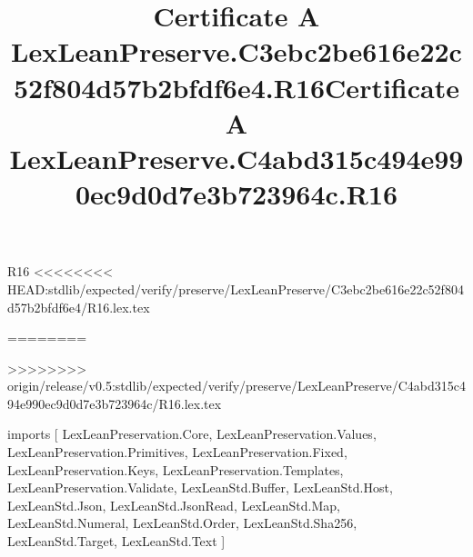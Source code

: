 \begin{lexlean}{R16}
<<<<<<<< HEAD:stdlib/expected/verify/preserve/LexLeanPreserve/C3ebc2be616e22c52f804d57b2bfdf6e4/R16.lex.tex
\title{Certificate A LexLeanPreserve.C3ebc2be616e22c52f804d57b2bfdf6e4.R16}
========
\title{Certificate A LexLeanPreserve.C4abd315c494e990ec9d0d7e3b723964c.R16}
>>>>>>>> origin/release/v0.5:stdlib/expected/verify/preserve/LexLeanPreserve/C4abd315c494e990ec9d0d7e3b723964c/R16.lex.tex
\begin{coremodule}
imports [
  LexLeanPreservation.Core,
  LexLeanPreservation.Values,
  LexLeanPreservation.Primitives,
  LexLeanPreservation.Fixed,
  LexLeanPreservation.Keys,
  LexLeanPreservation.Templates,
  LexLeanPreservation.Validate,
  LexLeanStd.Buffer,
  LexLeanStd.Host,
  LexLeanStd.Json,
  LexLeanStd.JsonRead,
  LexLeanStd.Map,
  LexLeanStd.Numeral,
  LexLeanStd.Order,
  LexLeanStd.Sha256,
  LexLeanStd.Target,
  LexLeanStd.Text
]


\end{coremodule}
\end{lexlean}
